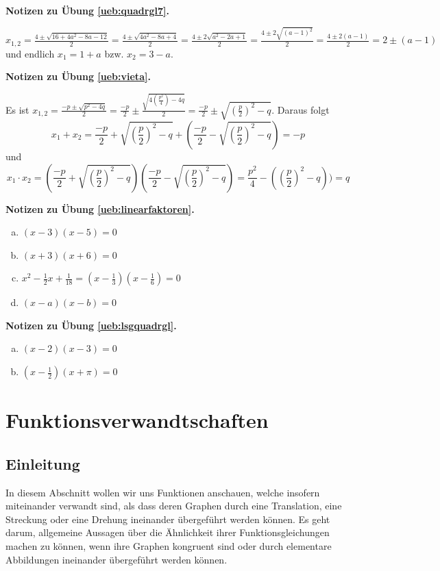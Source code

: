 \documentclass[%
11pt,%
twoside,%
titlepage,%
german,%
headsepline%
]{scrartcl}
\newcommand{\concatueb}[1]{ueb:#1}%
\newcommand{\concatlsg}[1]{lsg:#1}%
\newenvironment{lsg}[1]{%
    \par\noindent\textbf{Notizen zu Übung \ref{\concatueb{#1}}.}%
    \label{\concatlsg{#1}}
}{%
    \par%
}
\begin{document}
\begin{lsg}{quadrgl7}
    $x_{1,2}=\frac{4\pm\sqrt{16+4a^2-8a-12}}{2}=\frac{4\pm\sqrt{4a^2-8a+4}}{2}=\frac{4\pm2\sqrt{a^2-2a+1}}{2}=\frac{4\pm2\sqrt{(a-1)^2}}{2}=\frac{4\pm2(a-1)}{2}=2\pm(a-1)$ und endlich $x_1=1+a$ bzw. $x_2=3-a$.
\end{lsg}
\begin{lsg}{vieta}
    Es ist $x_{1,2}=\frac{-p\pm\sqrt{p^2-4q}}{2}=\frac{-p}{2}\pm\frac{\sqrt{4(\frac{p^2}{4})-4q}}{2}=\frac{-p}{2}\pm\sqrt{(\frac{p}{2})^2-q}$. Daraus folgt
    $$x_1+x_2=\frac{-p}{2}+\sqrt{(\frac{p}{2})^2-q}+\left(\frac{-p}{2}-\sqrt{(\frac{p}{2})^2-q}\right)=-p$$
    und
    $$x_1\cdot x_2=\left(\frac{-p}{2}+\sqrt{(\frac{p}{2})^2-q}\right)\left(\frac{-p}{2}-\sqrt{(\frac{p}{2})^2-q}\right)=\frac{p^2}{4}-((\frac{p}{2})^2-q))=q$$
\end{lsg}
\begin{lsg}{linearfaktoren}
    \begin{enumerate}[a)]
        \item $(x-3)(x-5)=0$
        \item $(x+3)(x+6)=0$
        \item $x^2-\frac{1}{2}x+\frac{1}{18}=(x-\frac{1}{3})(x-\frac{1}{6})=0$
        \item $(x-a)(x-b)=0$
    \end{enumerate}
\end{lsg}
\begin{lsg}{lsgquadrgl}
    \begin{enumerate}[a)]
        \item $(x-2)(x-3)=0$
        \item $(x-\tfrac{1}{2})(x+\pi)=0$
    \end{enumerate}
\end{lsg}

\clearpage

\section{Funktionsverwandtschaften}

\subsection{Einleitung}
  In diesem Abschnitt wollen wir uns Funktionen anschauen, welche insofern miteinander verwandt sind, als dass deren Graphen durch eine Translation, eine Streckung oder eine Drehung ineinander übergeführt werden können. Es geht darum, allgemeine Aussagen über die Ähnlichkeit ihrer Funktionsgleichungen machen zu können, wenn ihre Graphen kongruent sind oder durch elementare Abbildungen ineinander übergeführt werden können.
\end{document}
